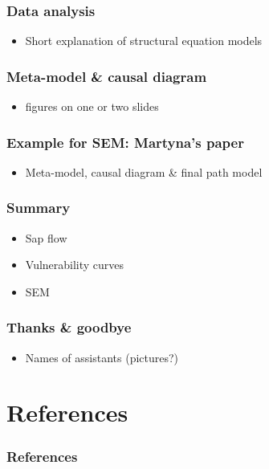 \documentclass[usepdftitle=false]{beamer}
\begin{document}
\begin{frame}
	\frametitle{Data analysis}
	\begin{itemize}
		\item Short explanation of structural equation models		
	\end{itemize}
\end{frame}

\begin{frame}
	\frametitle{Meta-model \& causal diagram}
	\begin{itemize}
		\item figures on one or two slides		
	\end{itemize}
\end{frame}

\begin{frame}
	\frametitle{Example for SEM: Martyna's paper}
	\begin{itemize}
		\item Meta-model, causal diagram \& final path model	
	\end{itemize}
\end{frame}

\begin{frame}
	\frametitle{Summary}
	\begin{itemize}
		\item Sap flow
		\item Vulnerability curves
		\item SEM
	\end{itemize}
\end{frame}


\begin{frame}
	\frametitle{Thanks \& goodbye}
	\begin{itemize}
		\item Names of assistants (pictures?)
	\end{itemize}
\end{frame}

\section{References}
\begin{frame}
	\frametitle{References}
\end{frame}
\end{document}
